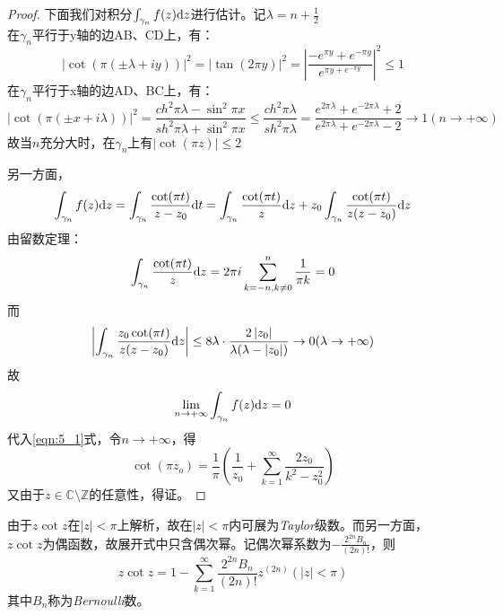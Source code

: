\begin{proof}
	下面我们对积分$\int_{\gamma_n}{f(z)\mathrm{d}z}$进行估计。记$\lambda = n+ \frac{1}{2}$\\
	在$\gamma_n$平行于y轴的边AB、CD上，有：
	\begin{equation*}
	\left| \cot  (\pi(\pm\lambda +iy))\right|^2=\left| \tan (2\pi y)\right| ^2=\left| \frac{-e^{\pi y}+e^{-\pi y}}{e^{\pi y+e^{-\pi y}}} \right|^2 \le 1
	\end{equation*}
	在$\gamma_n$平行于x轴的边AD、BC上，有：
	\begin{equation*}
	\left| \cot  (\pi(\pm x +i\lambda))\right|^2=\frac{ch^2\pi\lambda - \sin^2 \pi x}{sh^2 \pi \lambda + \sin^2 \pi x}\le \frac{ch^2 \pi \lambda}{sh^2 \pi \lambda}=\frac{e^{2\pi\lambda}+e^{-2\pi\lambda}+2}{e^{2\pi\lambda}+e^{-2\pi\lambda}-2}\to 1 (n\to + \infty)
	\end{equation*}
	故当$n$充分大时，在$\gamma_n$上有$\left| \cot (\pi z)\right| \le 2$\par
	另一方面，
	\begin{equation*}
	\int_{\gamma_n}{f(z)\mathrm{d}z}=\int_{\gamma_n}\frac{\cot (\pi t)}{z-z_0}\mathrm{d}t=\int_{\gamma_n}\frac{\cot (\pi t)}{z}\mathrm{d}z +z_0\int_{\gamma_n}\frac{\cot (\pi t)}{z(z-z_0)}\mathrm{d}z
	\end{equation*}
	由留数定理：
	\begin{equation*}
	\int_{\gamma_n}\frac{\cot (\pi t)}{z}\mathrm{d}z=2\pi i\sum\limits_{k=-n,k\neq 0}^n{\frac{1}{\pi k}}=0
	\end{equation*}
	而\begin{equation*}
	\left| \int_{\gamma_n}\frac{z_0 \cot (\pi t)}{z(z-z_0)}\mathrm{d}z \right| \le 8\lambda \cdot \frac{2\left| z_0 \right|}{\lambda(\lambda-\left| z_0 \right|)}\to 0 (\lambda \to + \infty)
	\end{equation*}故
	\begin{equation*}
	\lim\limits_{n\to +\infty}\int_{\gamma_n}{f(z)\mathrm{d}z}=0
	\end{equation*}
	代入\eqref{eqn:5_1}式，令$n\to +\infty$，得
	\begin{equation*}
	\cot (\pi z_o)=\frac{1}{\pi}(\frac{1}{z_0}+\sum\limits_{k=1}^{\infty}{\frac{2z_0}{k^2-z_0^2}})
	\end{equation*}又由于$z\in \mathbb{C}\setminus \mathbb{Z}$的任意性，得证。		
\end{proof}

由于$z\cot z$在$\left| z \right|<\pi$上解析，故在$\left| z \right|<\pi$内可展为\emph{Taylor}级数。而另一方面，$z\cot z$为偶函数，故展开式中只含偶次幂。记偶次幂系数为$-\frac{2^{2n}B_n}{(2n)!}$，则\begin{equation*}
z\cot z=1-\sum\limits_{k=1}^{\infty}\frac{2^{2n}B_n}{(2n)!}z^(2n)(\left| z \right| < \pi)
\end{equation*}其中$B_n$称为\emph{Bernoulli}数。

